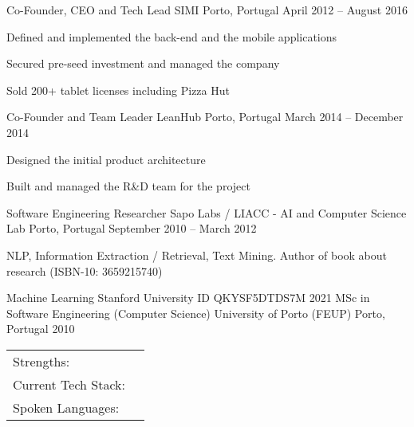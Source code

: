 \documentclass[]{awesome-cv}
\begin{document}
\begin{cventries}
	\vspace{-4mm}
	\cventry
	{Co-Founder, CEO and Tech Lead}
	{SIMI}
	{Porto, Portugal}
	{April 2012 – August 2016}
	{\begin{cvitems}
		\item {Defined and implemented the back-end and the mobile applications}
		\item {Secured pre-seed investment and managed the company }
		\item {Sold 200+ tablet licenses including Pizza Hut}
		\end{cvitems}}

	\vspace{-4mm}
	\cventry
	{Co-Founder and Team Leader}
	{LeanHub}
	{Porto, Portugal}
	{March 2014 – December 2014}
	{\begin{cvitems}
		\item {Designed the initial product architecture}
		\item {Built and managed the R\&D team for the project}
		\end{cvitems}}

	\vspace{-4mm}
	\cventry
	{Software Engineering Researcher}
	{Sapo Labs / LIACC - AI and Computer Science Lab}
	{Porto, Portugal}
	{September 2010 – March 2012}
	{\begin{cvitems}
		\item {NLP, Information Extraction / Retrieval, Text Mining. Author of book about research (ISBN-10: 3659215740)}
		\end{cvitems}}
\end{cventries}
\vspace{-5mm}

\vspace{-3mm}
\begin{cvhonors}
	\cvhonor
	{Machine Learning}
	{Stanford University}
	{ID QKYSF5DTDS7M}
	{2021}
	\cvhonor
	{MSc in Software Engineering (Computer Science)}
	{University of Porto (FEUP)}
	{Porto, Portugal}
	{2010}
\end{cvhonors}

\vspace{-3mm}
\begin{cventries}
	\vspace{-2mm}
	\cventry
	{}
	{\def\arraystretch{1.15}{\begin{tabular}{ l l }
		Strengths:  & {\skill{ Leadership, Builder, Problem Solver, Outside-the-box Thinking, Coach, Self-Motivated, "Do-it" Attitude }} \\
		Current Tech Stack:  & {\skill{ Hack, PHP, React, Javascript, GraphQL, Relay (Full-Stack Eng) }} \\
		Spoken Languages:  & {\skill{ English, Portuguese, French, Spanish, Slovene}} \\
		\end{tabular}}}
	{}
	{}
	{}
\end{cventries}
\end{document}
